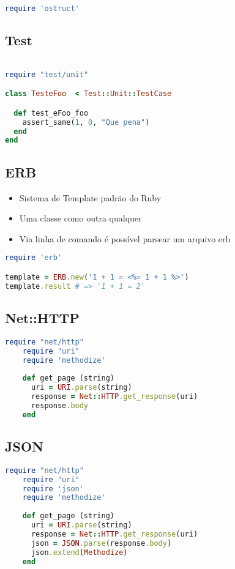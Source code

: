 \documentclass[serif,mathserif]{article}
\begin{document}
\begin{lstlisting}[language=ruby]
require 'ostruct'
\end{lstlisting}

\subsection{Test}

\begin{lstlisting}[language=ruby]

require "test/unit"

class TesteFoo  < Test::Unit::TestCase

  def test_eFoo_foo
    assert_same(1, 0, "Que pena")
  end
end
\end{lstlisting}

\subsection{ERB}

\begin{itemize}
  \item Sistema de Template padrão do Ruby
  \item Uma classe como outra qualquer
  \item Via linha de comando é possível parsear um arquivo erb
\end{itemize}

\begin{lstlisting}[language=ruby]
require 'erb'

template = ERB.new('1 + 1 = <%= 1 + 1 %>')
template.result # => '1 + 1 = 2'
\end{lstlisting}

\subsection{Net::HTTP}

\begin{lstlisting}[language=ruby]
	require "net/http"
	require "uri"
	require 'methodize'
	
	def get_page (string)
	  uri = URI.parse(string)
	  response = Net::HTTP.get_response(uri)
	  response.body
	end
\end{lstlisting}

\subsection{JSON}

\begin{lstlisting}[language=ruby]
	require "net/http"
	require "uri"
	require 'json'
	require 'methodize'
	
	def get_page (string)
	  uri = URI.parse(string)
	  response = Net::HTTP.get_response(uri)
	  json = JSON.parse(response.body)
	  json.extend(Methodize)
	end
\end{lstlisting}
\end{document}
